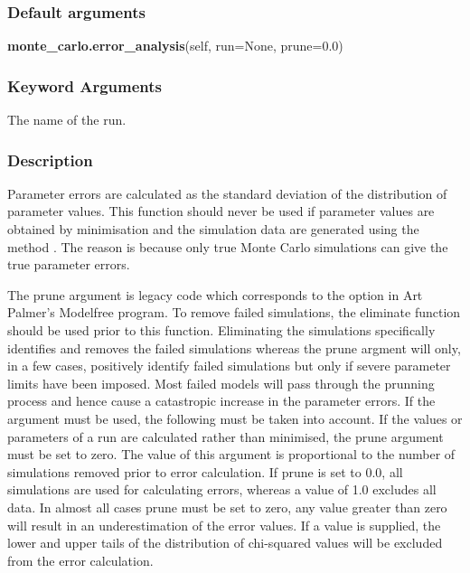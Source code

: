 \subsubsection{Default arguments}

\textsf{\textbf{monte\_carlo.error\_analysis}(self, run=None, prune=0.0)}


\subsubsection{Keyword Arguments}

  The name of the run.


\subsubsection{Description}

Parameter errors are calculated as the standard deviation of the distribution of parameter
values.  This function should never be used if parameter values are obtained by minimisation
and the simulation data are generated using the method 
.  The reason is because only
true Monte Carlo simulations can give the true parameter errors.

The prune argument is legacy code which corresponds to the 
 option in Art Palmer's
Modelfree program.  To remove failed simulations, the eliminate function should be used
prior to this function.  Eliminating the simulations specifically identifies and removes the
failed simulations whereas the prune argment will only, in a few cases, positively identify
failed simulations but only if severe parameter limits have been imposed.  Most failed
models will pass through the prunning process and hence cause a catastropic increase in the
parameter errors.  If the argument must be used, the following must be taken into account.
If the values or parameters of a run are calculated rather than minimised, the prune
argument must be set to zero.  The value of this argument is proportional to the number of
simulations removed prior to error calculation.  If prune is set to 0.0, all simulations are
used for calculating errors, whereas a value of 1.0 excludes all data.  In almost all cases
prune must be set to zero, any value greater than zero will result in an underestimation of
the error values.  If a value is supplied, the lower and upper tails of the distribution of
chi-squared values will be excluded from the error calculation.



